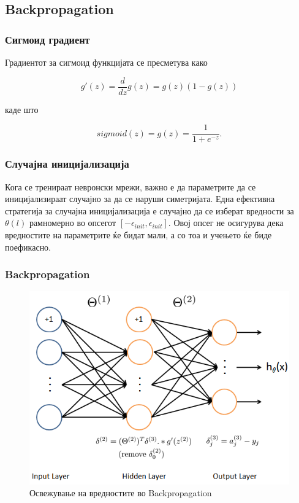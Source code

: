 \subsection{Backpropagation}

\subsubsection{Сигмоид градиент}

Градиентот за сигмоид функцијата се пресметува како

\[
	g'(z) = \frac{d}{dz}g(z) = g(z)(1 - g(z))
\]

каде што

\[
	sigmoid(z) = g(z) = \frac{1}{1 + e^{-z}}.
\]

\subsubsection{Случајна иницијализација}

Кога се тренираат невронски мрежи, важно е да параметрите да се иницијализираат
случајно за да се наруши симетријата. Една ефективна стратегија за случајна
иницијализација е случајно да се изберат вредности за $\theta(l)$ рамномерно во
опсегот $[-\epsilon_{init}, \epsilon_{init}]$. Овој опсег не осигурува дека
вредностите на параметрите ќе бидат мали, а со тоа и учењето ќе биде поефикасно.



\subsubsection{Backpropagation}

\begin{figure}[htb]
\centering
\includegraphics[width=.9\textwidth]{src/neuralNetwork2/nnb}
\caption{Освежување на вредностите во Backpropagation}
\label{fig:backpropagation}
\end{figure}

